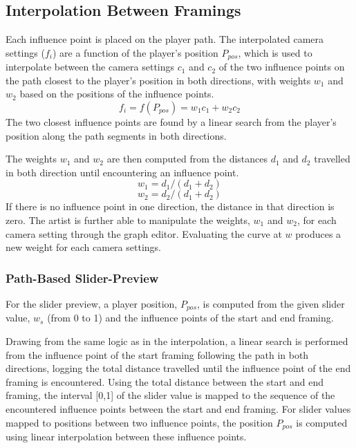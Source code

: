 \subsection{Interpolation Between Framings} \label{interpolationChapter}
Each influence point is placed on the player path. The interpolated camera settings ($f_{i}$) are a function of the player's position $P_{pos}$, which is used to interpolate between the camera settings $c_1$ and $c_2$ of the two influence points on the path closest to the player's position in both directions, with weights $w_1$ and $w_2$ based on the positions of the influence points.
\begin{equation}
f_{i} = f(P_{pos}) = w_1c_1+w_2c_2
\end{equation}
The two closest influence points are found by a linear search from the player's position along the path segments in both directions.

The weights $w_1$ and $w_2$ are then computed from the distances $d_1$ and $d_2$ travelled in both direction until encountering an influence point.
\begin{equation}
w_1 = {d_1}/(d_1 + d_2)
\end{equation}
\begin{equation}
w_2 = {d_2}/(d_1 + d_2)
\end{equation}
If there is no influence point in one direction, the distance in that direction is zero. The artist is further able to manipulate the weights, $w_1$ and $w_2$, for each camera setting through the graph editor. Evaluating the curve at $w$ produces a new weight for each camera settings.


\subsubsection{Path-Based Slider-Preview}
For the slider preview, a player position, $P_{pos}$, is computed from the given slider value, $w_s$ (from 0 to 1) and the influence points of the start and end framing.

Drawing from the same logic as in the interpolation, a linear search is performed from the influence point of the start framing following the path in both directions, logging the total distance travelled until the influence point of the end framing is encountered. Using the total distance between the start and end framing, the interval [0,1] of the slider value is mapped to the sequence of the encountered influence points between the start and end framing. For slider values mapped to positions between two influence points, the position $P_{pos}$ is computed using linear interpolation between these influence points.

